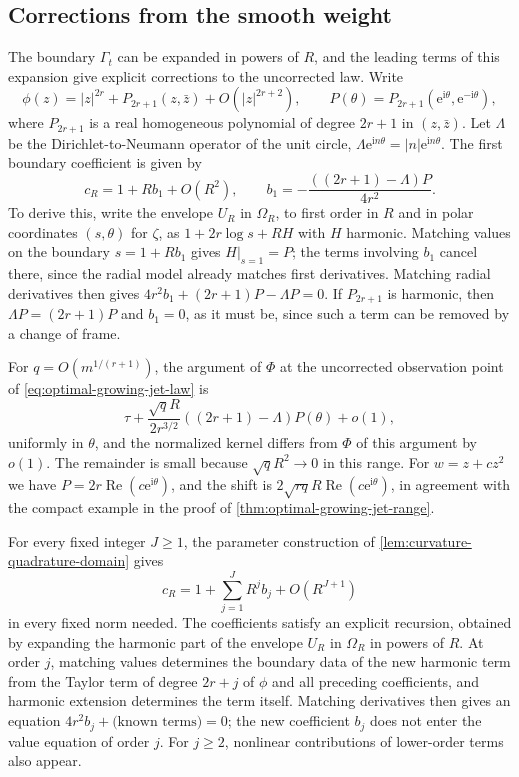 \subsection{Corrections from the smooth weight}
\label{sec:growing-jet-corrections}

The boundary $\Gamma_t$ can be expanded in powers of $R$, and the leading terms of this expansion give explicit corrections to the uncorrected law. Write
\[
 \phi(z)=|z|^{2r}+P_{2r+1}(z,\bar z)+O(|z|^{2r+2}),\qquad
 P(\theta)=P_{2r+1}(\mathrm{e}^{\mathrm{i}\theta},\mathrm{e}^{-\mathrm{i}\theta}),
\]
where $P_{2r+1}$ is a real homogeneous polynomial of degree $2r+1$ in $(z,\bar z)$. Let $\Lambda$ be the Dirichlet-to-Neumann operator of the unit circle,
$\Lambda \mathrm{e}^{\mathrm{i} n\theta}=|n|\mathrm{e}^{\mathrm{i} n\theta}$. The first boundary coefficient is given by
\begin{equation}\label{eq:first-boundary-coefficient}
 c_R=1+Rb_1+O(R^2),\qquad
 b_1=-\frac{((2r+1)-\Lambda)P}{4r^2}.
\end{equation}
To derive this, write the envelope $U_R$ in $\Omega_R$, to first order in $R$ and in polar coordinates $(s,\theta)$ for $\zeta$, as
$1+2r\log s+R H$ with $H$ harmonic. Matching values on the boundary
$s=1+Rb_1$ gives $H|_{s=1}=P$; the terms involving $b_1$ cancel there, since the radial model already matches first derivatives. Matching radial derivatives then gives $4r^2b_1+(2r+1)P-\Lambda P=0$.
If $P_{2r+1}$ is harmonic, then $\Lambda P=(2r+1)P$ and $b_1=0$, as it must be, since such a term can be removed by a change of frame.

For $q=O(m^{1/(r+1)})$, the argument of $\Phi$ at the uncorrected observation point of \eqref{eq:optimal-growing-jet-law} is
\begin{equation}\label{eq:first-growing-jet-shift}
 \tau+\frac{\sqrt q R}{2r^{3/2}}((2r+1)-\Lambda)P(\theta)+o(1),
\end{equation}
uniformly in $\theta$, and the normalized kernel differs from $\Phi$ of this argument by $o(1)$. The remainder is small because $\sqrt q R^2\to0$ in this range. For $w=z+cz^2$ we have $P=2r\operatorname{Re}(c\mathrm{e}^{\mathrm{i}\theta})$, and the shift is
$2\sqrt{rq}R\operatorname{Re}(c\mathrm{e}^{\mathrm{i}\theta})$, in agreement with the compact example in the proof of \cref{thm:optimal-growing-jet-range}.

For every fixed integer $J\geq1$, the parameter construction of \cref{lem:curvature-quadrature-domain} gives
\[
 c_R=1+\sum_{j=1}^J R^j b_j+O(R^{J+1})
\]
in every fixed norm needed. The coefficients satisfy an explicit recursion, obtained by expanding the harmonic part of the envelope $U_R$ in $\Omega_R$ in powers of $R$. At order $j$, matching values determines the boundary data of the new harmonic term from the Taylor term of degree $2r+j$ of $\phi$ and all preceding coefficients, and harmonic extension determines the term itself. Matching derivatives then gives an equation $4r^2b_j+\text{(known terms)}=0$; the new coefficient $b_j$ does not enter the value equation of order $j$. For $j\geq2$, nonlinear contributions of lower-order terms also appear.

